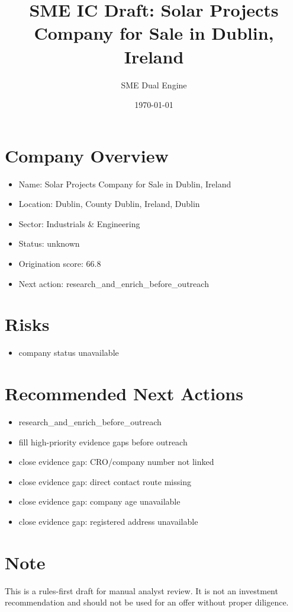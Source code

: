 \documentclass[11pt,a4paper]{article}
\title{SME IC Draft: Solar Projects Company for Sale in Dublin, Ireland}
\author{SME Dual Engine}
\date{\today}
\begin{document}
\maketitle
\section*{Company Overview}
\begin{itemize}[leftmargin=1.4em]
\item Name: Solar Projects Company for Sale in Dublin, Ireland
\item Location: Dublin, County Dublin, Ireland, Dublin
\item Sector: Industrials \& Engineering
\item Status: unknown
\item Origination score: 66.8
\item Next action: research\_and\_enrich\_before\_outreach
\end{itemize}
\section*{Risks}
\begin{itemize}[leftmargin=1.4em]
\item company status unavailable
\end{itemize}
\section*{Recommended Next Actions}
\begin{itemize}[leftmargin=1.4em]
\item research\_and\_enrich\_before\_outreach
\item fill high-priority evidence gaps before outreach
\item close evidence gap: CRO/company number not linked
\item close evidence gap: direct contact route missing
\item close evidence gap: company age unavailable
\item close evidence gap: registered address unavailable
\end{itemize}
\section*{Note}
This is a rules-first draft for manual analyst review. It is not an investment
recommendation and should not be used for an offer without proper diligence.
\end{document}

